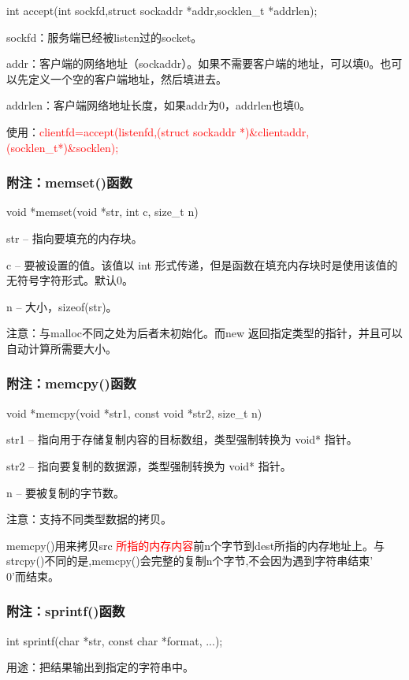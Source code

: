 \documentclass[UTF8]{article}%
\begin{document}
int accept(int sockfd,struct sockaddr *addr,socklen\_t *addrlen);

sockfd：服务端已经被listen过的socket。

addr：客户端的网络地址（sockaddr）。如果不需要客户端的地址，可以填0。也可以先定义一个空的客户端地址，然后填进去。

addrlen：客户端网络地址长度，如果addr为0，addrlen也填0。

使用：\textcolor{red}{clientfd=accept(listenfd,(struct sockaddr *)\&clientaddr,(socklen\_t*)\&socklen);}

\subsubsection{附注：memset()函数}

void *memset(void *str, int c, size\_t n)

str -- 指向要填充的内存块。

c -- 要被设置的值。该值以 int 形式传递，但是函数在填充内存块时是使用该值的无符号字符形式。默认0。

n -- 大小，sizeof(str)。

注意：与malloc不同之处为后者未初始化。而new 返回指定类型的指针，并且可以自动计算所需要大小。

\subsubsection{附注：memcpy()函数}

void *memcpy(void *str1, const void *str2, size\_t n)

str1 -- 指向用于存储复制内容的目标数组，类型强制转换为 void* 指针。

str2 -- 指向要复制的数据源，类型强制转换为 void* 指针。

n -- 要被复制的字节数。

注意：支持不同类型数据的拷贝。

memcpy()用来拷贝src \textcolor{red}{所指的内存内容}前n个字节到dest所指的内存地址上。与strcpy()不同的是,memcpy()会完整的复制n个字节,不会因为遇到字符串结束'\\0'而结束。

\subsubsection{附注：sprintf()函数}

int sprintf(char *str, const char *format, ...);

用途：把结果输出到指定的字符串中。
\end{document}
